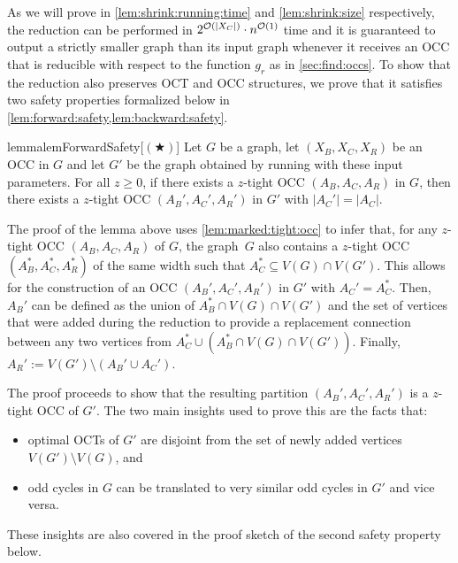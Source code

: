As we will prove in \cref{lem:shrink:running:time} and \cref{lem:shrink:size} respectively, the reduction can be performed in $2^{\mathcal{O}(|X_C|)} \cdot n^{\mathcal{O}(1)}$ time and it is guaranteed to output a strictly smaller graph than its input graph whenever it receives an OCC that is reducible with respect to the function $g_r$ as in \cref{sec:find:occs}. To show that the reduction also preserves OCT and OCC structures, we prove that it satisfies two safety properties formalized below in \cref{lem:forward:safety,lem:backward:safety}.

\begin{restatable}{lemma}{lemForwardSafety}[$(\bigstar)$] \label{lem:forward:safety}
	Let $G$ be a graph, let $(X_B, X_C, X_R)$ be an OCC in $G$ and let $G'$ be the graph obtained by running  with these input parameters. For all $z \geq 0$, if there exists a $z$-tight OCC $(A_B, A_C, A_R)$ in $G$, then there exists a $z$-tight OCC $(A_B', A_C', A_R')$ in $G'$ with $|A_C'| = |A_C|$.
\end{restatable}

The proof of the lemma above uses \cref{lem:marked:tight:occ} to infer that, for any $z$-tight OCC $(A_B, A_C, A_R)$ of $G$, the graph~$G$ also contains a $z$-tight OCC $(A_B^\ast, A_C^\ast, A_R^\ast)$ of the same width such that $A_C^\ast \subseteq V(G) \cap V(G')$. This allows for the construction of an OCC $(A_B', A_C', A_R')$ in $G'$ with $A_C' = A_C^\ast$. Then, $A_B'$ can be defined as the union of $A_B^\ast \cap V(G) \cap V(G')$ and the set of vertices that were added during the reduction to provide a replacement connection between any two vertices from $A_C^\ast \cup (A_B^\ast \cap V(G) \cap V(G'))$. Finally, $A_R' := V(G') \setminus (A_B' \cup A_C')$.

The proof proceeds to show that the resulting partition $(A_B', A_C', A_R')$ is a $z$-tight OCC of $G'$. The two main insights used to prove this are the facts that: 
\begin{itemize}
	\item optimal OCTs of $G'$ are disjoint from the set of newly added vertices $V(G') \setminus V(G)$, and
	\item odd cycles in $G$ can be translated to very similar odd cycles in $G'$ and vice versa.
\end{itemize}
These insights are also covered in the proof sketch of the second safety property below.

